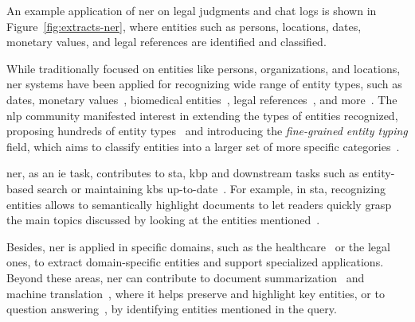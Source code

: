 An example application of \ac{ner} on legal judgments and chat logs is shown in Figure~\ref{fig:extracts-ner}, where entities such as persons, locations, dates, monetary values, and legal references are identified and classified.


While traditionally focused on entities like persons, organizations, and locations, \ac{ner} systems have been applied for recognizing wide range of entity types, such as dates, monetary values~\cite{muc6_overview_1995}, biomedical entities~\cite{hanisch2005prominer,archana2023effective,aioner_bioner_2023}, legal references~\cite{chalkidis_extracting_contracts_2017,cardellino_etal_2017_lowcost,ccetindaug2023name_legal_turkish}, and more~\cite{entityorientedsearch2018balog}. The \ac{nlp} community manifested interest in extending the types of entities recognized, proposing hundreds of entity types~\cite{sekine2002extended_150ner_types,sekine2004definition_200ner_types,yosef-etal-2012-hyena} and introducing the \emph{fine-grained entity typing} field, which aims to classify entities into a larger set of more specific categories~\cite{fget_review_2023}.

\ac{ner}, as an \acl{ie} task, contributes to \acl{sta}, \acl{kbp} and downstream tasks such as entity-based search or maintaining \acp{kb} up-to-date~\cite{entityorientedsearch2018balog}. For example, in \ac{sta}, recognizing entities allows to semantically highlight documents to let readers quickly grasp the main topics discussed by looking at the entities mentioned~\cite{swoopes2025interfacedesignsupportlegal,ziwei_abstractexplorer_2025,raymond_skimming_sci_2023}. 

Besides, \ac{ner} is applied in specific domains, such as the healthcare~\cite{hanisch2005prominer,archana2023effective,aioner_bioner_2023} or the legal~\cite{chalkidis_extracting_contracts_2017,cardellino_etal_2017_lowcost,ccetindaug2023name_legal_turkish} ones, to extract domain-specific entities and support specialized applications.
Beyond these areas, \ac{ner} can contribute to document summarization~\cite{khademi2020persian,lin-zeldes-2024-gumsley,roha_ner_summarizaton_2023} and machine translation~\cite{xie2022end,hkiri-etal-2017-arabic}, where it helps preserve and highlight key entities, or to question answering~\cite{molla2006named,ner_qa_review_2016}, by identifying entities mentioned in the query.


